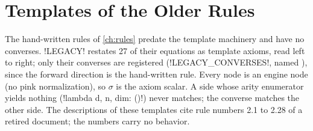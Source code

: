 \section{Templates of the Older Rules}\label{sec:completeness-legacy}

The hand-written rules of \cref{ch:rules} predate the template machinery and have no converses.
\py!LEGACY! restates 27 of their equations as template axioms, read left to right; only their
converses are registered (\py!LEGACY_CONVERSES!, named ), since the forward
direction is the hand-written rule. Every node is an engine node (no pink normalization), so
$\sigma$ is the axiom scalar. A side whose arity enumerator yields nothing (\py!lambda d, n, dim: ()!)
never matches; the converse matches the other side. The descriptions of these templates cite
rule numbers 2.1 to 2.28 of a retired document; the numbers carry no behavior.

